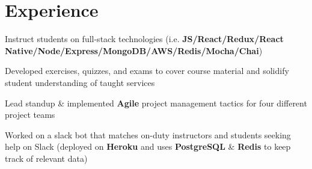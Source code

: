 \documentclass[letterpaper]{deedy-resume} %
\begin{document}
\begin{minipage}[t]{0.66\textwidth} %


  

  \section{Experience}



  \vspace{3mm}
  \begin{tightitemize}
  \item Instruct students on full-stack technologies (i.e. \textbf{JS/React/Redux/React Native/Node/Express/MongoDB/AWS/Redis/Mocha/Chai})
  \item Developed exercises, quizzes, and exams to cover course material and solidify student understanding of taught services
  \item Lead standup \& implemented \textbf{Agile} project management tactics for four different project teams
  \item Worked on a slack bot that matches on-duty instructors and students seeking help on Slack (deployed on \textbf{Heroku} and uses \textbf{PostgreSQL} \& \textbf{Redis} to keep track of relevant data)
  \end{tightitemize}

  \sectionspace %



\end{minipage}
\end{document}
